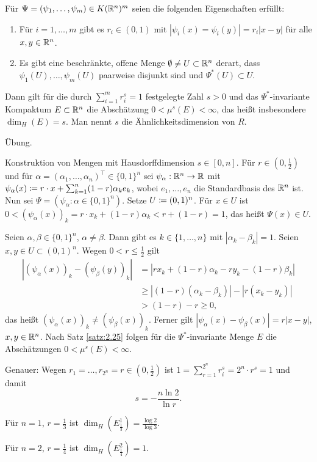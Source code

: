 \documentclass[a4paper,twoside,DIV15,BCOR12mm]{scrbook}
\begin{document}
\begin{satz}[Hutchinson, 1981]
\label{satz:2.25}
Für $\Psi= (\psi_1,\ldots,\psi_m)\in K(\mathbb{R}^n)^m$ seien die folgenden Eigenschaften erfüllt:
\begin{enumerate}
\item Für $i=1,\ldots,m$ gibt es $r_i\in(0,1)$ mit $|\psi_i(x) = \psi_i(y)| = r_i|x-y|$ für alle $x,y\in\mathbb{R}^n$.
\item Es gibt eine beschränkte, offene Menge $\emptyset \ne U\subset\mathbb{R}^n$ derart, dass $\psi_1(U),\ldots,\psi_m(U)$ paarweise disjunkt sind und $\Psi^*(U) \subset U$.
\end{enumerate}
Dann gilt für die durch $\sum_{i=1}^m r_i^s = 1$ festgelegte Zahl $s>0$ und das $\Psi^*$-invariante Kompaktum $E\subset \mathbb{R}^n$ die Abschätzung $0<\mu^s(E) < \infty$, das heißt insbesondere $\dim_H(E)= s$. Man nennt $s$ die Ähnlichkeitsdimension von $R$.
\end{satz}

\begin{beweis}
Übung.
\end{beweis}

Konstruktion von Mengen mit Hausdorffdimension $s\in[0,n]$. Für $r\in(0,\frac12)$ und für $\alpha=(\alpha_1,\ldots,\alpha_n)^\top\in\{0,1\}^n$ sei $\psi_\alpha : \mathbb{R}^n \to \mathbb{R}$ mit $\psi_\alpha(x) \da r\cdot x + \sum_{k=1}^n (1-r)\alpha_ke_k$, wobei $e_1,\ldots,e_n$ die Standardbasis des $\mathbb{R}^n$ ist. Nun sei $\Psi=(\psi_\alpha: \alpha\in\{0,1\}^n)$. Setze $U\da (0,1)^n$. Für $x\in U$ ist $0 < (\psi_\alpha(x))_k = r\cdot x_k + (1-r)\alpha_k < r + (1-r) = 1$, das heißt $\Psi(x) \in U$.

Seien $\alpha,\beta \in\{0,1\}^n$, $\alpha \ne \beta$. Dann gibt es $k\in\{1,\ldots,n\}$ mit $|\alpha_k - \beta_k| = 1$. Seien $x,y\in U\subset (0,1)^n$. Wegen $0<r\le \frac12$ gilt
\begin{align*}
|(\psi_\alpha(x))_k - (\psi_\beta(y))_k|
&= |rx_k + (1-r)\alpha_k - ry_k - (1-r)\beta_k|\\
&\ge |(1-r)(\alpha_k - \beta_k)| - |r(x_k-y_k)|\\
&> (1-r) - r \ge 0,
\end{align*}
das heißt $(\psi_\alpha(x))_k \ne (\psi_\beta(x))_k$. Ferner gilt $|\psi_\alpha(x) - \psi_\beta(x)| = r |x-y|$, $x,y\in \mathbb{R}^n$.  Nach Satz \ref{satz:2.25} folgen für die $\Psi^*$-invariante Menge $E$ die Abschätzungen $0<\mu^s(E)<\infty$. 

Genauer: Wegen $r_1=\ldots,r_{2^n}=r\in(0,\frac12)$ ist $1 = \sum_{r=1}^{2^n} r_i^s = 2^n \cdot r^s = 1$ und damit
\[
s = -\frac{n \ln 2}{\ln r}.
\]

\begin{beispiele}
\item Für $n=1$, $r=\frac13$ ist $\dim_H(E_{\frac13}^1) = \frac{\log 2}{\log 3}$.
\item Für $n=2$, $r=\frac14$ ist $\dim_H(E_{\frac14}^2) = 1$.
\end{beispiele}
\end{document}

